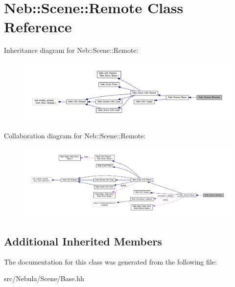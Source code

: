 \hypertarget{classNeb_1_1Scene_1_1Remote}{\section{Neb\-:\-:Scene\-:\-:Remote Class Reference}
\label{classNeb_1_1Scene_1_1Remote}
}


Inheritance diagram for Neb\-:\-:Scene\-:\-:Remote\-:
\nopagebreak
\begin{figure}[H]
\begin{center}
\leavevmode
\includegraphics[width=350pt]{classNeb_1_1Scene_1_1Remote__inherit__graph}
\end{center}
\end{figure}


Collaboration diagram for Neb\-:\-:Scene\-:\-:Remote\-:
\nopagebreak
\begin{figure}[H]
\begin{center}
\leavevmode
\includegraphics[width=350pt]{classNeb_1_1Scene_1_1Remote__coll__graph}
\end{center}
\end{figure}
\subsection*{Additional Inherited Members}


The documentation for this class was generated from the following file\-:\begin{DoxyCompactItemize}
\item 
src/\-Nebula/\-Scene/Base.\-hh\end{DoxyCompactItemize}
